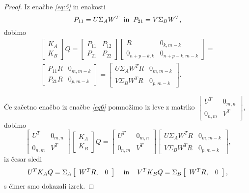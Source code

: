 \documentclass[mat1]{article}
\begin{document}
\begin{proof}
Iz enačbe  \textit{\eqref{eq:5}} in enakosti
$$
P_{11} = U \Sigma_A W^T
\hspace{2mm} \text{in} \hspace{2mm}
P_{21} = V \Sigma_B W^T \text{,}
$$ dobimo
\begin{equation} \label{eq6}
\begin{split}
\begin{bmatrix} 
K_A \\
K_B 
\end{bmatrix} Q =
\begin{bmatrix} 
P_{11} & P_{12} \\
P_{21} & P_{22} 
\end{bmatrix}
\begin{bmatrix} 
R & 0_{k, m-k} \\
0_{n+p-k, k} & 0_{n+p-k, m-k}  
\end{bmatrix} =
\\
\begin{bmatrix} 
P_{11}R & 0_{m, m-k} \\
P_{21}R & 0_{p, m-k} 
\end{bmatrix} =
\begin{bmatrix} 
U \Sigma_A W^T R & 0_{m, m-k} \\
V \Sigma_B W^T R & 0_{p, m-k} 
\end{bmatrix} \text{.}
\end{split}
\end{equation}

Če začetno enačbo iz enačbe \textit{\eqref{eq6}} pomnožimo iz leve z matriko 
$
\begin{bmatrix}
U^T & 0_{m, n} \\
0_{n, m} & V^T
\end{bmatrix}
$, dobimo 
$$
\begin{bmatrix}
U^T & 0_{m, n} \\
0_{n, m} & V^T
\end{bmatrix}
\begin{bmatrix} 
K_A \\
K_B 
\end{bmatrix} Q =
\begin{bmatrix}
U^T & 0_{m, n} \\
0_{n, m} & V^T
\end{bmatrix}
\begin{bmatrix} 
U \Sigma_A W^T R & 0_{m, m-k} \\
V \Sigma_B W^T R & 0_{p, m-k} 
\end{bmatrix} \text{,}
$$
iz česar sledi
$$
U^T K_A Q = 
\Sigma_A  \left[\begin{array}{cc} W^T R, & 0 \end{array}\right] \hspace{4mm} \text{in} \hspace{4mm} V^T K_B Q = \Sigma_B  \left[\begin{array}{cc} W^T R, & 0 \end{array}\right] \text{,}
$$
s čimer smo dokazali izrek.
\end{proof}
\end{document}
